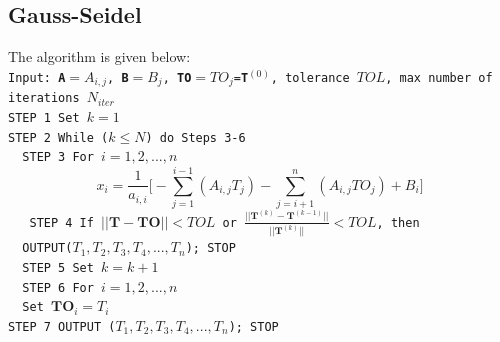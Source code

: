\documentclass[12pt]{amsart}   %
\begin{document}
\subsection{Gauss-Seidel} The algorithm is given below: \\
{\tt{Input: \textbf{A}$=A_{i,j}$, \textbf{B}$=B_j$, \textbf{TO}$=TO_j$=\textbf{T}$^{(0)}$, tolerance $TOL$, max number of iterations $N_{iter}$ \\
STEP 1 Set $k=1$ \\
STEP 2 While ($k\leq N$) do Steps 3-6 \\
\textcolor{white}{.}\hspace{1cm} STEP 3 For $i=1,2,...,n$
\begin{equation*}
    x_{i}= \frac{1}{a_{i,i}}\bigg[-\sum_{j=1}^{i-1} (A_{i,j}T_j)- \sum_{j=i+1}^n (A_{i,j} TO_j) + B_i \bigg]
\end{equation*}
\textcolor{white}{.}\hspace{1cm} STEP 4 If $||\textbf{T}-\textbf{TO}||<TOL$ or $\frac{||\textbf{T}^{(k)}-\textbf{T}^{(k-1)}||}{||\textbf{T}^{(k)}||}<TOL$, then \\ \textcolor{white}{.}\hspace{6cm} OUTPUT($T_1,T_2,T_3,T_4,...,T_n$); {STOP} \\
\textcolor{white}{.}\hspace{1cm} STEP 5 Set $k=k+1$ \\
\textcolor{white}{.}\hspace{1cm} STEP 6 For $i=1,2,...,n$\\
\textcolor{white}{.}\hspace{2.5cm} Set $\textbf{TO}_i = T_i$\\
STEP 7 OUTPUT ($T_1,T_2,T_3,T_4,...,T_n$); STOP\\
}}
\end{document}
